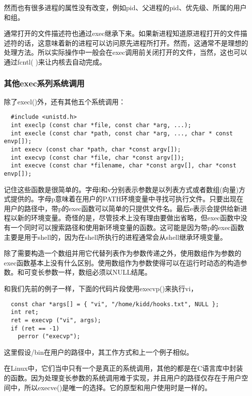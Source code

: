 然而也有很多进程的属性没有改变，例如pid、父进程的pid、优先级、所属的用户和组。

通常打开的文件描述符也通过exec继承下来。如果新进程知道原进程打开的文件描述符的话，这意味着新的进程可以访问原先进程所打开。然而，这通常不是理想的处理方法。所以实际操作中一般会在exec调用前关闭打开的文件，当然，这也可以通过fcntl( )来让内核去自动完成。

\subsubsection{其他exec系列系统调用}

除了execl()外，还有其他五个系统调用：

\begin{lstlisting}
  #include <unistd.h>
  int execlp (const char *file, const char *arg, ...);
  int execle (const char *path, const char *arg, ..., char * const envp[]);
  int execv (const char *path, char *const argv[]);
  int execvp (const char *file, char *const argv[]);
  int execve (const char *filename, char *const argv[], char *const envp[]);
\end{lstlisting}

记住这些函数是很简单的。字母l和v分别表示参数是以列表方式或者数组(向量)方式提供的。字母p意味着在用户的PATH环境变量中寻找可执行文件。只要出现在用户的路径中，带p的exec函数可以简单的只提供文件名。最后e表示会提供给新进程以新的环境变量。奇怪的是，尽管技术上没有理由要做出省略，但exec函数中没有一个同时可以搜索路径和使用新环境变量的函数。这可能是因为带p的exec函数主要是用于shell的，因为在shell所执行的进程通常会从shell继承环境变量。

除了需要构造一个数组并用它代替列表作为参数传递之外，使用数组作为参数的exec函数基本上没有什么区别。使用数组作为参数使得可以在运行时动态的构造参数。和可变长参数一样，数组必须以NULL结尾。

和我们先前的例子一样，下面的代码片段使用execvp()来执行vi，

\begin{lstlisting}
  const char *args[] = { "vi", "/home/kidd/hooks.txt", NULL };
  int ret;
  ret = execvp ("vi", args);
  if (ret == -1)
    perror ("execvp");
\end{lstlisting}

这里假设/bin在用户的路径中，其工作方式和上一个例子相似。

在Linux中，它们当中只有一个是真正的系统调用，其他的都是在C语言库中封装的函数。因为处理变长参数的系统调用难于实现，并且用户的路径仅存在于用户空间中，所以execve()是唯一的选择。它的原型和用户使用时是一样的。


